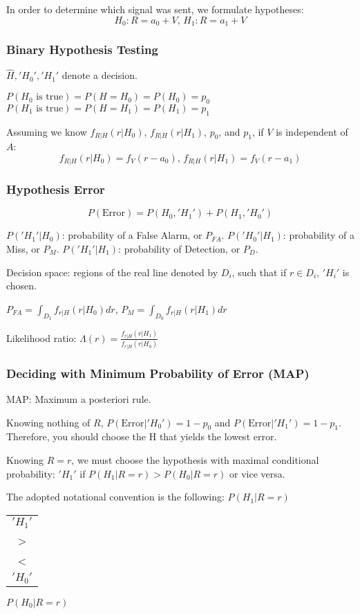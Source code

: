 \documentclass[8pt]{extarticle}
\begin{document}
\begin{multicols*}{3}
\begin{center}
In order to determine which signal was sent, we formulate hypotheses:
\[ H_0: R = a_0 + V \text{, } H_1: R = a_1 + V \]

\subsubsection{Binary Hypothesis Testing}
\( \hat{H}, 'H_0', 'H_1' \) denote a decision.

\( P(H_0 \text{ is true}) = P(H = H_0) = P(H_0) = p_0 \) \( P(H_1 \text{ is true}) = P(H = H_1) = P(H_1) = p_1 \)

Assuming we know \( f_{R|H}(r|H_0) \), \( f_{R|H}(r|H_1) \), \( p_0 \), and \( p_1 \), if \( V \) is independent of \( A \):
\[ f_{R|H}(r|H_0) = f_V(r-a_0) \text{, } f_{R|H}(r|H_1) = f_V(r-a_1) \]

\subsubsection{Hypothesis Error}
\[ P(\text{Error}) = P(H_0, 'H_1') + P(H_1, 'H_0') \]

\( P('H_1'|H_0) \): probability of a False Alarm, or \( P_{FA} \).
\( P('H_0'|H_1) \): probability of a Miss, or \( P_M \).
\( P('H_1'|H_1) \): probability of Detection, or \( P_D \).

Decision space: regions of the real line denoted by \( D_i \), such that if \( r \in D_i \), \( 'H_i' \) is chosen.

\( P_{FA} = \int_{D_1} f_{r|H}(r|H_0) dr \), \( P_M = \int_{D_0} f_{r|H}(r|H_1) dr \)

Likelihood ratio: \( \Lambda(r) = \frac{f_{r|H}(r|H_1)}{f_{r|H}(r|H_0)} \)

\subsubsection{Deciding with Minimum Probability of Error (MAP)}
MAP: Maximum a posteriori rule.

Knowing nothing of \( R \), \( P(\text{Error}|'H_0') = 1-p_0 \) and \( P(\text{Error}|'H_1') = 1-p_1 \). Therefore, you should choose the H that yields the lowest error.

Knowing \( R = r \), we must choose the hypothesis with maximal conditional probability:
\( 'H_1' \) if \( P(H_1|R=r) > P(H_0|R=r) \) or vice versa.

The adopted notational convention is the following:
\( P(H_1|R=r) \) \begin{tabular}{c} \( 'H_1' \) \\ > \\ < \\ \('H_0'\) \\ \end{tabular} \( P(H_0|R=r) \)


\end{center}
\end{multicols*}
\end{document}

